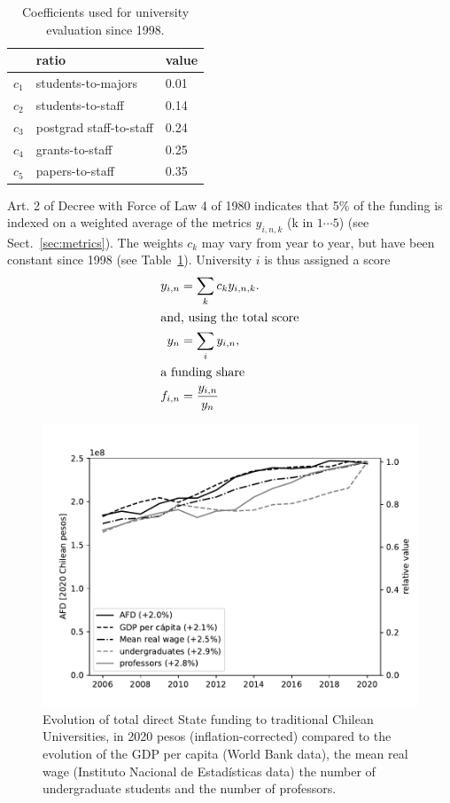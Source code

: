 \documentclass[twocolumn]{article}
\begin{document}
\begin{table}[t]
\centering
\caption{Coefficients used for university evaluation since 1998.}
\label{tab:coeff}
\begin{tabular}{lll}
\hline\hline
      & ratio                   & value\\
\hline
$c_1$ & students-to-majors      & 0.01\\
$c_2$ & students-to-staff       & 0.14\\
$c_3$ & postgrad staff-to-staff & 0.24\\
$c_4$ & grants-to-staff         & 0.25\\
$c_5$ & papers-to-staff         & 0.35\\
\hline
\end{tabular}
\end{table}


Art. 2 of Decree with Force of Law 4 of 1980 indicates that 5\% of the funding
is indexed on a weighted average of the metrics $y_{i,n,k}$ (k in $1\cdots5$)
(see Sect.~\ref{sec:metrics}). The weights $c_k$ may vary from year to year,
but have been constant since 1998 (see Table~\ref{tab:coeff}).  University $i$
is thus assigned a score
\begin{subequations}
\begin{align}
    y_{i,n}    &= \sum_k c_k y_{i,n,k}. \label{eq:y}\\
\intertext{and, using the total score}
    y_{n}      &= \sum_i y_{i,n},\\
\intertext{a funding share}
    f_{i,n}    &= \frac{y_{i,n}}{y_{n}} \label{eq:f}
\end{align}
\end{subequations}


\begin{figure}[t]
\centering
\includegraphics[width=\linewidth]{pdf/total-afd-timeseries.pdf}
\caption{Evolution of total direct State funding to traditional Chilean Universities, in 2020 pesos (inflation-corrected) compared to the evolution of the GDP per capita (World Bank data), the mean real wage (Instituto Nacional de Estadísticas data) the number of undergraduate students and the number of professors.}
\label{fig:total-afd}
\end{figure}
\end{document}
